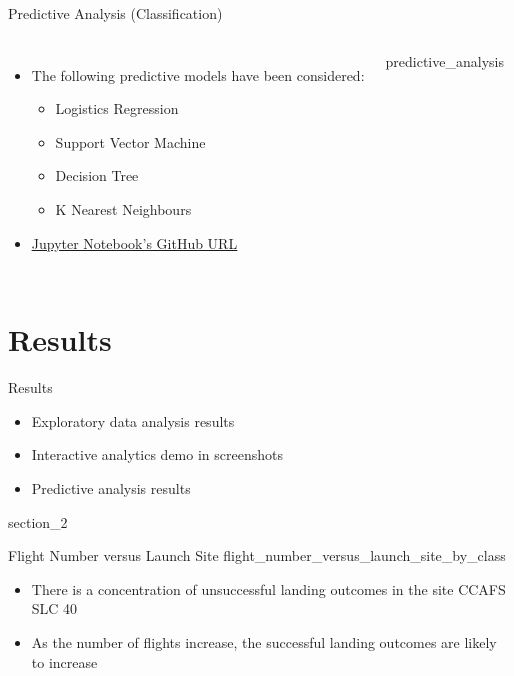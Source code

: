 \begin{frame}{Predictive Analysis (Classification)}
    \begin{columns}
            \begin{itemize}
                \item The following predictive models have been considered:
                \begin{itemize}
                    \item Logistics Regression
                    \item Support Vector Machine
                    \item Decision Tree
                    \item K Nearest Neighbours
                \end{itemize}
                \item \href{https://github.com/eyamrog/ibm_data_science/blob/main/10_Data_Science_Capstone_Machine_Learning_Prediction.ipynb}{\uline{Jupyter Notebook's GitHub URL}}
            \end{itemize}
            {predictive_analysis}
    \end{columns}
\end{frame}

\section{Results}

\begin{frame}{Results}
    \begin{itemize}
        \item Exploratory data analysis results
        \item Interactive analytics demo in screenshots
        \item Predictive analysis results
    \end{itemize}
\end{frame}

{
{section_2}
\begin{frame}[plain]
\end{frame}
}

\begin{frame}{Flight Number versus Launch Site}
    {flight_number_versus_launch_site_by_class}
    \begin{itemize}
        \item There is a concentration of unsuccessful landing outcomes in the site CCAFS SLC 40
        \item As the number of flights increase, the successful landing outcomes are likely to increase
    \end{itemize}
\end{frame}

